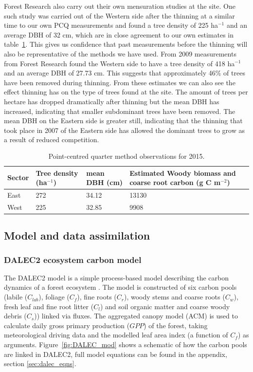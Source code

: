 \documentclass[11pt]{article}
\begin{document}
Forest Research also carry out their own mensuration studies at the site. One such study was carried out of the Western side after the thinning at a similar time to our own PCQ measurements and found a tree density of 225 ha\(^{-1}\) and an average DBH of 32 cm, which are in close agreement to our own estimates in table~\ref{table:cwoo_obs}. This gives us confidence that past measurements before the thinning will also be representative of the methods we have used. From 2009 measurements from Forest Research found the Western side to have a tree density of 418 ha\(^{-1}\) and an average DBH of 27.73 cm. This suggests that approximately 46\% of trees have been removed during thinning. From these estimates we can also see the effect thinning has on the type of trees found at the site. The amount of trees per hectare has dropped dramatically after thinning but the mean DBH has increased, indicating that smaller subdominant trees have been removed. The mean DBH on the Eastern side is greater still, indicating that the thinning that took place in 2007 of the Eastern side has allowed the dominant trees to grow as a result of reduced competition.

\begin{table}[ht] 
\begin{center}
	\begin{tabularx}{\textwidth}{| l | l | l | X |}
	\hline
	Sector & Tree density (ha\(^{-1}\)) & mean DBH (cm) & Estimated Woody biomass and coarse root carbon (g C m\(^{-2}\)) \\ \hline
	East & 272 & 34.12 & 13130 \\ \hline
	West & 225 & 32.85 & 9908 \\ \hline
	\end{tabularx}
	\caption{Point-centred quarter method observations for 2015.}
	\label{table:cwoo_obs}
\end{center} 
\end{table}

\subsection{Model and data assimilation}
\subsubsection{DALEC2 ecosystem carbon model} \label{sec:dalec2}

The DALEC2 model is a simple process-based model describing the carbon dynamics of a forest ecosystem \citep{Bloom2015}. The model is constructed of six carbon pools (labile ($C_{lab}$), foliage ($C_f$), fine roots ($C_r$), woody stems and coarse roots ($C_w$), fresh leaf and fine root litter ($C_l$) and soil organic matter and coarse woody debris ($C_s$)) linked via fluxes. The aggregated canopy model (ACM) \citep{williams1997predicting} is used to calculate daily gross primary production ($GPP$) of the forest, taking meteorological driving data and the modelled leaf area index (a function of $C_f$) as arguments. Figure~\ref{fig:DALEC_mod} shows a schematic of how the carbon pools are linked in DALEC2, full model equations can be found in the appendix, section \ref{sec:dalec_eqns}.   
\end{document}
